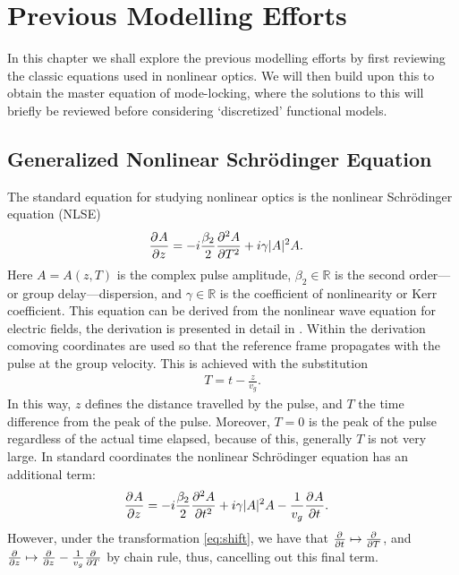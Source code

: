 
\chapter{Previous Modelling Efforts}
In this chapter we shall explore the previous modelling efforts by first reviewing the classic equations used in nonlinear optics. We will then build upon this to obtain the master equation of mode-locking, where the solutions to this will briefly be reviewed before considering `discretized' functional models. \\

\section{Generalized Nonlinear Schr\"odinger Equation}
The standard equation for studying nonlinear optics is the nonlinear Schr\"odinger equation (NLSE) \cite{agrawal2013, anderson, burgoyne2007, desurvire, ferreira, finot, rothenberg}
\begin{align*}
\pdiff{A}{z} &= - i \frac{\beta_2}{2}\pdiff[2]{A}{T} + i \gamma |A|^2 A.
\end{align*}
Here $A = A(z, T)$ is the complex pulse amplitude, $\beta_2 \in \mathbb{R}$ is the second order---or group delay---dispersion, and $\gamma \in \mathbb{R}$ is the coefficient of nonlinearity or Kerr coefficient. This equation can be derived from the nonlinear wave equation for electric fields, the derivation is presented in detail in \cite{agrawal2013, ferreira}. Within the derivation comoving coordinates are used so that the reference frame propagates with the pulse at the group velocity. This is achieved with the substitution
\begin{align}
\label{eq:shift}
T = t - \frac{z}{v_g}.
\end{align}
In this way, $z$ defines the distance travelled by the pulse, and $T$ the time difference from the peak of the pulse. Moreover, $T = 0$ is the peak of the pulse regardless of the actual time elapsed, because of this, generally $T$ is not very large. In standard coordinates the nonlinear Schr\"odinger equation has an additional term:
\begin{align*}
\pdiff{A}{z} &= - i \frac{\beta_2}{2}\pdiff[2]{A}{t} + i \gamma |A|^2 A - \frac{1}{v_g} \pdiff{A}{t}.
\end{align*}
However, under the transformation \eqref{eq:shift}, we have that $\pdiff{}{t} \mapsto \pdiff{}{T}$, and $\pdiff{}{z} \mapsto \pdiff{}{z} - \frac{1}{v_g} \pdiff{}{T}$ by chain rule, thus, cancelling out this final term. \\

